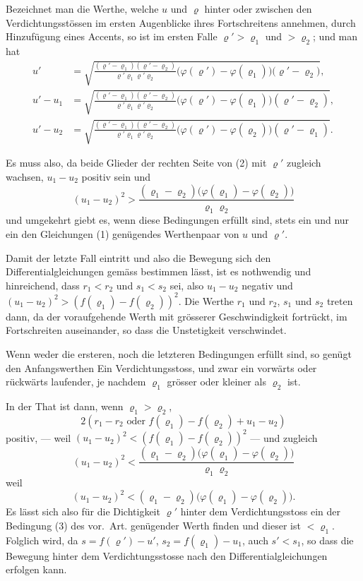 \documentclass[12pt,a4paper]{article}
\begin{document}
Bezeichnet man die Werthe, welche $u$ und $\varrho$ hinter oder zwischen den Verdichtungsst\"ossen im ersten Augenblicke ihres Fortschreitens annehmen, durch Hinzuf\"ugung eines Accents, so ist im ersten Falle $\varrho' > \varrho_{1}$ und $> \varrho_{2}$; und man hat
\begin{align*}
u' &= \sqrt{\frac{(\varrho' - \varrho_{1})(\varrho' - \varrho_{2})}{\varrho'\varrho_{1}\varrho'\varrho_{2}}\bigl(\varphi(\varrho') - \varphi(\varrho_{1})\bigr)\bigl(\varrho' - \varrho_{2}\bigr)},\tag{1}\\
u' - u_{1} &= \sqrt{\frac{(\varrho' - \varrho_{1})(\varrho' - \varrho_{2})}{\varrho'\varrho_{1}\varrho'\varrho_{2}}\bigl(\varphi(\varrho') - \varphi(\varrho_{1})\bigr)(\varrho' - \varrho_{2})},\\
u' - u_{2} &= \sqrt{\frac{(\varrho' - \varrho_{1})(\varrho' - \varrho_{2})}{\varrho'\varrho_{1}\varrho'\varrho_{2}}\bigl(\varphi(\varrho') - \varphi(\varrho_{2})\bigr)(\varrho' - \varrho_{1})}.\tag{2}
\end{align*}

Es muss also, da beide Glieder der rechten Seite von (2) mit $\varrho'$ zugleich wachsen, $u_{1} - u_{2}$ positiv sein und
\[
(u_{1} - u_{2})^{2} > \frac{(\varrho_{1} - \varrho_{2})\bigl(\varphi(\varrho_{1}) - \varphi(\varrho_{2})\bigr)}{\varrho_{1}\varrho_{2}}
\]
und umgekehrt giebt es, wenn diese Bedingungen erf\"ullt sind, stets ein und nur ein den Gleichungen (1) gen\"ugendes Werthenpaar von $u$ und $\varrho'$.

Damit der letzte Fall eintritt und also die Bewegung sich den Differentialgleichungen gem\"ass bestimmen l\"asst, ist es nothwendig und hinreichend, dass $r_{1} < r_{2}$ und $s_{1} < s_{2}$ sei, also $u_{1} - u_{2}$ negativ und $(u_{1} - u_{2})^{2} > (f(\varrho_{1}) - f(\varrho_{2}))^{2}$. Die Werthe $r_{1}$ und $r_{2}$, $s_{1}$ und $s_{2}$ treten dann, da der voraufgehende Werth mit gr\"osserer Geschwindigkeit fortr\"uckt, im Fortschreiten auseinander, so dass die Unstetigkeit verschwindet.

Wenn weder die ersteren, noch die letzteren Bedingungen erf\"ullt sind, so gen\"ugt den Anfangswerthen Ein Verdichtungsstoss, und zwar ein vorw\"arts oder r\"uckw\"arts laufender, je nachdem $\varrho_{1}$ gr\"osser oder kleiner als $\varrho_{2}$ ist.

In der That ist dann, wenn $\varrho_{1} > \varrho_{2}$,
\[
2(r_{1} - r_{2}\text{ oder }f(\varrho_{1}) - f(\varrho_{2}) + u_{1} - u_{2})
\]
positiv, --- weil $(u_{1} - u_{2})^{2} < (f(\varrho_{1}) - f(\varrho_{2}))^{2}$ --- und zugleich
\[
(u_{1} - u_{2})^{2} < \frac{(\varrho_{1} - \varrho_{2})\bigl(\varphi(\varrho_{1}) - \varphi(\varrho_{2})\bigr)}{\varrho_{1}\varrho_{2}}
\]
weil
\[
(u_{1} - u_{2})^{2} < (\varrho_{1} - \varrho_{2})\bigl(\varphi(\varrho_{1}) - \varphi(\varrho_{2})\bigr).
\]
Es l\"asst sich also f\"ur die Dichtigkeit $\varrho'$ hinter dem Verdichtungsstoss ein der Bedingung (3) des vor.~Art. gen\"ugender Werth finden und dieser ist $< \varrho_{1}$. Folglich wird, da $s = f(\varrho') - u'$, $s_{2} = f(\varrho_{1}) - u_{1}$, auch $s' < s_{1}$, so dass die Bewegung hinter dem Verdichtungsstosse nach den Differentialgleichungen erfolgen kann.
\end{document}
